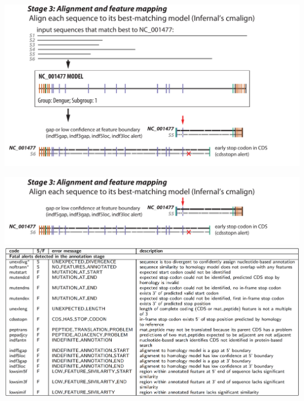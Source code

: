 \documentclass[landscape]{slides}
\begin{document}
\begin{slide}
\begin{center}

\includegraphics[width=10.5in]{figs/v-annotate-stage3-3}
\end{center}

\vfill
\end{slide}
\begin{slide}
\begin{center}

\includegraphics[width=10.5in]{figs/v-annotate-stage3-4}
\includegraphics[width=10.5in]{figs/ss-alignment-alert-list}

\end{center}
\vfill
\end{slide}
\end{document}
